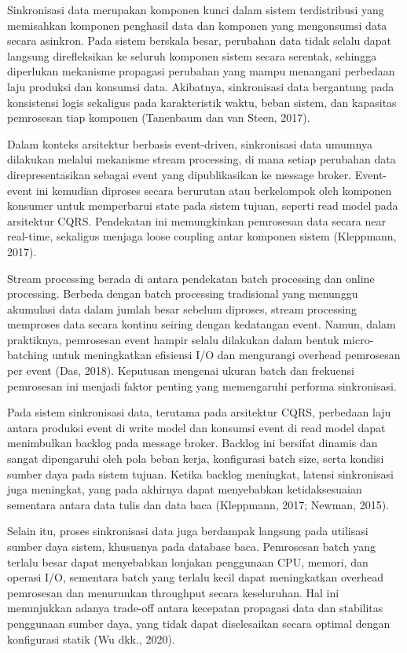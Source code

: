 Sinkronisasi data merupakan komponen kunci dalam sistem terdistribusi yang memisahkan komponen penghasil data dan komponen yang mengonsumsi data secara asinkron.
Pada sistem berskala besar, perubahan data tidak selalu dapat langsung direfleksikan ke seluruh komponen sistem secara serentak, sehingga diperlukan mekanisme propagasi perubahan yang mampu menangani perbedaan laju produksi dan konsumsi data.
Akibatnya, sinkronisasi data bergantung pada konsistensi logis sekaligus pada karakteristik waktu, beban sistem, dan kapasitas pemrosesan tiap komponen (Tanenbaum dan van Steen, 2017).

Dalam konteks arsitektur berbasis event-driven, sinkronisasi data umumnya dilakukan melalui mekanisme stream processing, di mana setiap perubahan data direpresentasikan sebagai event yang dipublikasikan ke message broker.
Event-event ini kemudian diproses secara berurutan atau berkelompok oleh komponen konsumer untuk memperbarui state pada sistem tujuan, seperti read model pada arsitektur CQRS.
Pendekatan ini memungkinkan pemrosesan data secara near real-time, sekaligus menjaga loose coupling antar komponen sistem (Kleppmann, 2017).

Stream processing berada di antara pendekatan batch processing dan online processing.
Berbeda dengan batch processing tradisional yang menunggu akumulasi data dalam jumlah besar sebelum diproses, stream processing memproses data secara kontinu seiring dengan kedatangan event.
Namun, dalam praktiknya, pemrosesan event hampir selalu dilakukan dalam bentuk micro-batching untuk meningkatkan efisiensi I/O dan mengurangi overhead pemrosesan per event (Das, 2018).
Keputusan mengenai ukuran batch dan frekuensi pemrosesan ini menjadi faktor penting yang memengaruhi performa sinkronisasi.

Pada sistem sinkronisasi data, terutama pada arsitektur CQRS, perbedaan laju antara produksi event di write model dan konsumsi event di read model dapat menimbulkan backlog pada message broker.
Backlog ini bersifat dinamis dan sangat dipengaruhi oleh pola beban kerja, konfigurasi batch size, serta kondisi sumber daya pada sistem tujuan.
Ketika backlog meningkat, latensi sinkronisasi juga meningkat, yang pada akhirnya dapat menyebabkan ketidaksesuaian sementara antara data tulis dan data baca (Kleppmann, 2017; Newman, 2015).

Selain itu, proses sinkronisasi data juga berdampak langsung pada utilisasi sumber daya sistem, khususnya pada database baca.
Pemrosesan batch yang terlalu besar dapat menyebabkan lonjakan penggunaan CPU, memori, dan operasi I/O, sementara batch yang terlalu kecil dapat meningkatkan overhead pemrosesan dan menurunkan throughput secara keseluruhan.
Hal ini menunjukkan adanya trade-off antara kecepatan propagasi data dan stabilitas penggunaan sumber daya, yang tidak dapat diselesaikan secara optimal dengan konfigurasi statik (Wu dkk., 2020).

